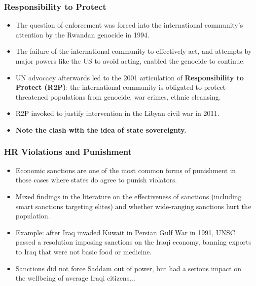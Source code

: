 \documentclass[handout]{beamer}
\begin{document}
\begin{frame} 
	\frametitle{\LARGE{Responsibility to Protect}}
	\begin{itemize}
		\item The question of enforcement was forced into the international community's attention by the Rwandan genocide in 1994. \pause
		\item The failure of the international community to effectively act, and attempts by major powers like the US to avoid acting, enabled the genocide to continue. \pause
		\item UN advocacy afterwards led to the 2001 articulation of \textbf{Responsibility to Protect (R2P)}: the international community is obligated to protect threatened populations from genocide, war crimes, ethnic cleansing. \pause
		\item R2P invoked to justify intervention in the Libyan civil war in 2011. \pause
		\item \textbf{Note the clash with the idea of state sovereignty.}
	\end{itemize}
\end{frame}

\begin{frame} 
	\frametitle{\LARGE{HR Violations and Punishment}}
	\begin{itemize}
		\item Economic sanctions are one of the most common forms of punishment in those cases where states do agree to punish violators. \pause
		\item Mixed findings in the literature on the effectiveness of sanctions (including smart sanctions targeting elites) and whether wide-ranging sanctions hurt the population. \pause
		\item Example:  after Iraq invaded Kuwait in Persian Gulf War in 1991, UNSC passed a resolution imposing sanctions on the Iraqi economy, banning exports to Iraq that were not basic food or medicine. \pause
		\item Sanctions did not force Saddam out of power, but had a serious impact on the wellbeing of average Iraqi citizens...		 
	\end{itemize}
\end{frame}

\end{document}
